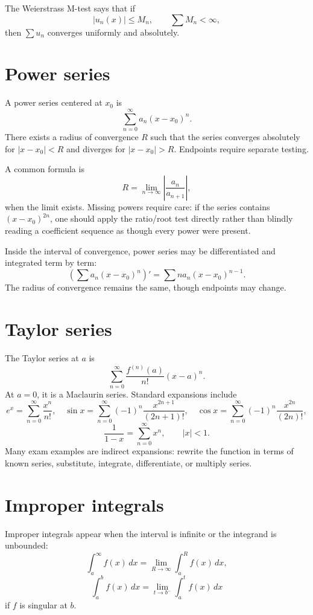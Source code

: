 The Weierstrass M-test says that if
\[
  |u_n(x)|\le M_n,\qquad \sum M_n<\infty,
\]
then $\sum u_n$ converges uniformly and absolutely.

\section{Power series}

A power series centered at $x_0$ is
\[
  \sum_{n=0}^{\infty}a_n(x-x_0)^n.
\]
There exists a radius of convergence $R$ such that the series converges absolutely for $|x-x_0|<R$ and diverges for $|x-x_0|>R$.  Endpoints require separate testing.

A common formula is
\[
  R=\lim_{n\to\infty}\left|\frac{a_n}{a_{n+1}}\right|,
\]
when the limit exists.  Missing powers require care: if the series contains $(x-x_0)^{2n}$, one should apply the ratio/root test directly rather than blindly reading a coefficient sequence as though every power were present.

Inside the interval of convergence, power series may be differentiated and integrated term by term:
\[
  \left(\sum a_n(x-x_0)^n\right)'=\sum n a_n(x-x_0)^{n-1}.
\]
The radius of convergence remains the same, though endpoints may change.

\section{Taylor series}

The Taylor series at $a$ is
\[
  \sum_{n=0}^{\infty}\frac{f^{(n)}(a)}{n!}(x-a)^n.
\]
At $a=0$, it is a Maclaurin series.  Standard expansions include
\[
  e^x=\sum_{n=0}^{\infty}\frac{x^n}{n!},\quad
  \sin x=\sum_{n=0}^{\infty}(-1)^n\frac{x^{2n+1}}{(2n+1)!},\quad
  \cos x=\sum_{n=0}^{\infty}(-1)^n\frac{x^{2n}}{(2n)!},
\]
\[
  \frac1{1-x}=\sum_{n=0}^{\infty}x^n,\qquad |x|<1.
\]
Many exam examples are indirect expansions: rewrite the function in terms of known series, substitute, integrate, differentiate, or multiply series.

\section{Improper integrals}

Improper integrals appear when the interval is infinite or the integrand is unbounded:
\[
  \int_a^{\infty}f(x)\,dx=\lim_{R\to\infty}\int_a^R f(x)\,dx,
\]
\[
  \int_a^b f(x)\,dx=\lim_{t\to b^-}\int_a^t f(x)\,dx
\]
if $f$ is singular at $b$.

